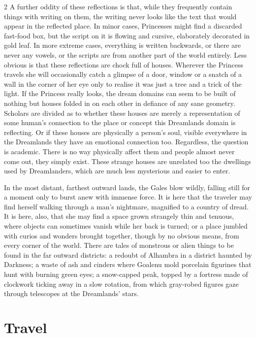 \begin{multicols}{2}
A further oddity of these reflections is that, while they frequently contain things with writing on them, the writing never looks like the text that would appear in the reflected place.  In minor cases, Princesses might find a discarded fast-food box, but the script on it is flowing and cursive, elaborately decorated in gold leaf. In more extreme cases, everything is written backwards, or there are never any vowels, 
or the scripts are from another part of the world entirely. Less obvious is that these reflections are chock full of houses. Wherever the Princess travels she will occasionally catch a glimpse of a door, window or a snatch of a wall in the corner of her eye only to realise it was just a tree and a trick of the light. If the Princess really looks, the dream domains can seem to be built of nothing but houses folded in on each other in defiance of any sane geometry. Scholars are divided as to whether these houses are merely a representation of some human's connection to the place or concept this Dreamlands domain is reflecting. Or if these houses are physically a person's soul, visible everywhere in the Dreamlands they have an emotional connection too. Regardless, the question is academic. There is no way physically affect them and people almost never come out, they simply exist. These strange houses are unrelated too the dwellings used by Dreamlanders, which are much less mysterious and easier to enter.

In the most distant, farthest outward lands, the Gales blow wildly, falling still for a moment only to burst anew with immense force.  It is here that the traveler may find herself walking through a man's nightmare, magnified to a country of dread.  It is here, also, that she may find a space grown strangely thin and tenuous, where objects can sometimes vanish while her back is turned; or a place jumbled with curios and wonders brought together, though by no obvious means, from every corner of the world.  There are tales of monstrous or alien things to be found in the far outward districts: a redoubt of Alhambra in a district haunted by Darkness; a waste of ash and cinders where Goalenu mold porcelain figurines that hunt with burning green eyes; a snow-capped peak, topped by a fortress made of clockwork ticking away in a slow rotation, from which gray-robed figures gaze through telescopes at the Dreamlands' stars.

\section*{Travel}


\end{multicols}
